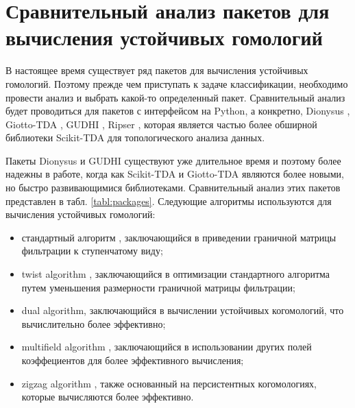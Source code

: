 \section{Сравнительный анализ пакетов для вычисления устойчивых гомологий}

В настоящее время существует ряд пакетов для вычисления устойчивых гомологий. Поэтому прежде чем приступать к задаче классификации, необходимо провести анализ и выбрать какой-то определенный пакет. Сравнительный анализ будет проводиться для пакетов с интерфейсом на Python, а конкретно, Dionysus \cite{dionysus}, Giotto-TDA \cite{giotto}, GUDHI \cite{gudhi}, Ripser \cite{Ripser}, которая является частью более обширной библиотеки Scikit-TDA \cite{scikit} для топологического анализа данных. 

Пакеты Dionysus и GUDHI существуют уже длительное время и поэтому более надежны в работе, когда как Scikit-TDA и Giotto-TDA являются более новыми, но быстро развивающимися библиотеками.
Сравнительный анализ этих пакетов представлен в табл. \ref{tabl:packages}.
Следующие алгоритмы используются для вычисления устойчивых гомологий:
\begin{itemize}
	\item стандартный алгоритм \cite{Zomorodian}, заключающийся в приведении граничной матрицы фильтрации к ступенчатому виду;
	\item twist algorithm \cite{twist}, заключающийся в оптимизации стандартного алгоритма путем уменьшения размерности граничной матрицы фильтрации;
	\item dual algorithm, заключающийся в вычислении устойчивых когомологий, что вычислительно более эффективно;
	\item multifield algorithm \cite{multifield}, заключающийся в использовании других полей коэффециентов для более эффективного вычисления;
	\item zigzag algorithm \cite{zigzag}, также основанный на персистентных когомологиях, которые вычисляются более эффективно. 
\end{itemize}
